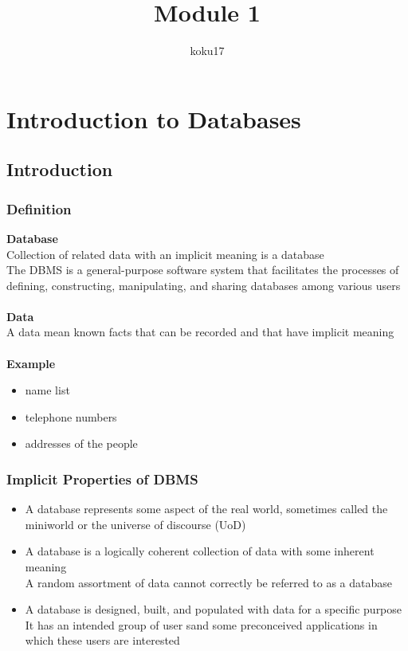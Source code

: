 \documentclass{article}
\title{Module 1}
\author{koku17}
\begin{document}
	\maketitle \thispagestyle{empty} \newpage
	\tableofcontents \thispagestyle{empty} \newpage
	\section{Introduction to Databases}
	\subsection{Introduction}
	\subsubsection{Definition}
	\textbf{Database} \\
	Collection of related data with an implicit meaning is a database \\
	The DBMS is a general-purpose software system that facilitates the processes of defining, constructing,
	manipulating, and sharing databases among various users \\ \null \\
	\textbf{Data} \\
	A data mean known facts that can be recorded and that have implicit meaning \\ \null \\
	\textbf{Example}
	\begin{itemize}[label=]
		\item name list
		\item telephone numbers
		\item addresses of the people
	\end{itemize}

	\subsubsection{Implicit Properties of DBMS}
	\begin{itemize}
		\item A database represents some aspect of the real world, sometimes called the miniworld or
			the universe of discourse (UoD)
		\item A database is a logically coherent collection of data with some inherent meaning \\
			A random assortment of data cannot correctly be referred to as a database
		\item A database is designed, built, and populated with data for a specific purpose \\
			It has an intended group of user sand some preconceived applications in which these users
			are interested
	\end{itemize}
\end{document}

